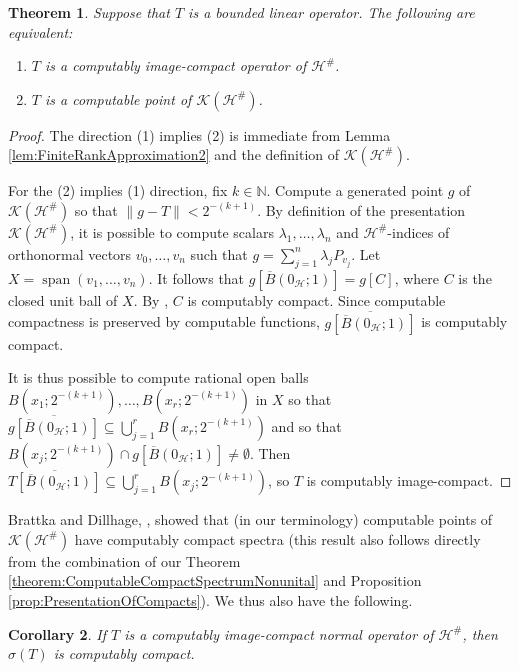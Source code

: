 \documentclass{amsart}
\newcommand{\norm}[1]{\left\| #1 \right\|}
\theoremstyle{plain}
\newtheorem{theorem}{Theorem}[section]
\newtheorem{corollary}[theorem]{Corollary}
\theoremstyle{definition}
\numberwithin{equation}{section}
\begin{document}
\begin{theorem}\label{theorem:EquivalentCompactness}
Suppose that $T$ is a bounded linear operator.  The following are equivalent:
\begin{enumerate}
    \item{$T$ is a computably image-compact operator of $\mathcal{H}^\#$.}
    \item{$T$ is a computable point of $\mathcal{K}(\mathcal{H}^\#)$.}
\end{enumerate}
\end{theorem}
\begin{proof}
The direction (1) implies (2) is immediate from Lemma \ref{lem:FiniteRankApproximation2} and the definition of $\mathcal{K}(\mathcal{H}^\#)$.

For the (2) implies (1) direction, fix $k \in \mathbb{N}$.  Compute a generated point $g$ of $\mathcal{K}(\mathcal{H}^\#)$ so that $\norm{g-T} < 2^{-(k+1)}$.  By definition of the presentation $\mathcal{K}(\mathcal{H}^\#)$, it is possible to compute scalars $\lambda_1, \ldots, \lambda_n$ and $\mathcal{H}^\#$-indices of orthonormal vectors $v_0, \ldots, v_n$ such that $g = \sum_{j=1}^n \lambda_jP_{v_j}$.  Let $X = \operatorname{span}(v_1, \ldots, v_n)$.  It follows that $g[\overline{B}(0_{\mathcal{H}}; 1)] = g[C]$, where $C$ is the closed unit ball of $X$.  By \cite[Proposition 3.7]{McNicholl.2020}, $C$ is computably compact.  Since computable compactness is preserved by computable functions, $\overline{g[\overline{B}(0_{\mathcal{H}}; 1)]}$ is computably compact.

It is thus possible to compute rational open balls $B(x_1; 2^{-(k+1)}), \ldots, B(x_r; 2^{-(k+1)})$ in $X$ so that $\overline{g[\overline{B}(0_{\mathcal{H}}; 1)]} \subseteq \bigcup_{j=1}^rB(x_r; 2^{-(k+1)})$ and so that $B(x_j; 2^{-(k+1)}) \cap g[\overline{B}(0_{\mathcal{H}}; 1)] \neq \emptyset$.  Then $\overline{T[\overline{B}(0_{\mathcal{H}}; 1)]} \subseteq \bigcup_{j=1}^rB(x_j; 2^{-(k+1)})$, so $T$ is computably image-compact.
\end{proof}

Brattka and Dillhage, \cite[Corollary 19]{BrattkaDillhage.2005}, showed that (in our terminology) computable points of $\mathcal{K}(\mathcal{H}^\#)$ have computably compact spectra (this result also follows directly from the combination of our Theorem \ref{theorem:ComputableCompactSpectrumNonunital} and Proposition \ref{prop:PresentationOfCompacts}).  We thus also have the following.

\begin{corollary}
If $T$ is a computably image-compact normal operator of $\mathcal{H}^\#$, then $\sigma(T)$ is computably compact.
\end{corollary}
\end{document}
